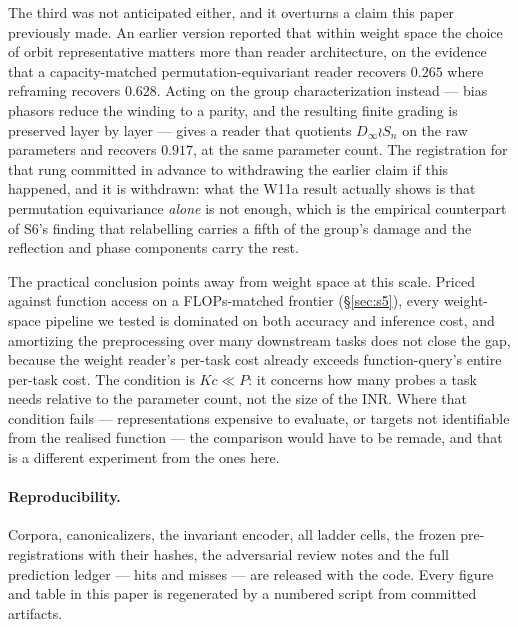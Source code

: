 \documentclass[10pt,letterpaper]{article}
\theoremstyle{definition}
\newcommand{\Dinf}{D_\infty}
\begin{document}
The third was not anticipated either, and it overturns a claim this paper previously made. An
earlier version reported that within weight space the choice of orbit representative matters more
than reader architecture, on the evidence that a capacity-matched permutation-equivariant reader
recovers $0.265$ where reframing recovers $0.628$. Acting on the group characterization instead ---
bias phasors reduce the winding to a parity, and the resulting finite grading is preserved layer by
layer --- gives a reader that quotients $\Dinf\wr S_n$ on the raw parameters and recovers
$\mathbf{0.917}$, at the same parameter count. The registration for that rung committed in advance
to withdrawing the earlier claim if this happened, and it is withdrawn: what the W11a result
actually shows is that permutation equivariance \emph{alone} is not enough, which is the
empirical counterpart of S6's finding that relabelling carries a fifth of the group's damage and
the reflection and phase components carry the rest.

The practical conclusion points away from weight space at this scale. Priced against function
access on a FLOPs-matched frontier (\S\ref{sec:s5}), every weight-space pipeline we tested is
dominated on both accuracy and inference cost, and amortizing the preprocessing over many
downstream tasks does not close the gap, because the weight reader's per-task cost already exceeds
function-query's entire per-task cost. The condition is $Kc \ll P$: it concerns how many probes a
task needs relative to the parameter count, not the size of the INR. Where that condition fails ---
representations expensive to evaluate, or targets not identifiable from the realised function ---
the comparison would have to be remade, and that is a different experiment from the ones here.

\paragraph{Reproducibility.} Corpora, canonicalizers, the invariant encoder, all ladder cells, the
frozen pre-registrations with their hashes, the adversarial review notes and the full prediction
ledger --- hits and misses --- are released with the code. Every figure and table in this paper is
regenerated by a numbered script from committed artifacts.
\end{document}
